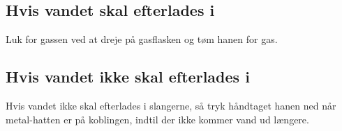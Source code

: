 \subsection{Hvis vandet skal efterlades i}
Luk for gassen ved at dreje på gasflasken og tøm hanen for gas.

\subsection{Hvis vandet ikke skal efterlades i}
Hvis vandet ikke skal efterlades i slangerne, så tryk håndtaget hanen
ned når metal-hatten er på koblingen, indtil der ikke kommer vand ud
længere.



